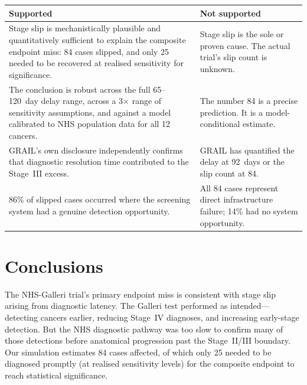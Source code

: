 \documentclass[11pt,letter]{article}
\begin{document}
\begin{tcolorbox}[colback=gray!5, colframe=gray!60, boxrule=0.5pt,
  arc=3pt, left=8pt, right=8pt, top=6pt, bottom=6pt]
\begin{tabular}{p{}p{}}
\toprule
\textbf{Supported} & \textbf{Not supported} \\
\midrule
Stage slip is mechanistically plausible and quantitatively sufficient to
explain the composite endpoint miss: 84 cases slipped, and only 25 needed
to be recovered at realised sensitivity for significance. &
Stage slip is the sole or proven cause. The actual trial's slip count is
unknown. \\[0.8em]
The conclusion is robust across the full 65--120~day delay range, across
a 3$\times$ range of sensitivity assumptions, and against a model
calibrated to NHS population data for all 12 cancers. &
The number 84 is a precise prediction. It is a model-conditional
estimate. \\[0.8em]
GRAIL's own disclosure independently confirms that diagnostic resolution
time contributed to the Stage~III excess. &
GRAIL has quantified the delay at 92~days or the slip count at 84. \\[0.8em]
86\% of slipped cases occurred where the screening system had a genuine
detection opportunity. &
All 84 cases represent direct infrastructure failure; 14\% had no system
opportunity. \\
\bottomrule
\end{tabular}
\end{tcolorbox}


\section{Conclusions}

The NHS-Galleri trial's primary endpoint miss is consistent with stage
slip arising from diagnostic latency. The Galleri test performed as
intended---detecting cancers earlier, reducing Stage~IV diagnoses, and
increasing early-stage detection. But the NHS diagnostic pathway was too
slow to confirm many of those detections before anatomical progression
past the Stage~II/III boundary. Our simulation estimates 84 cases affected,
of which only 25 needed to be diagnosed promptly (at realised sensitivity
levels) for the composite endpoint to reach statistical significance.
\end{document}
